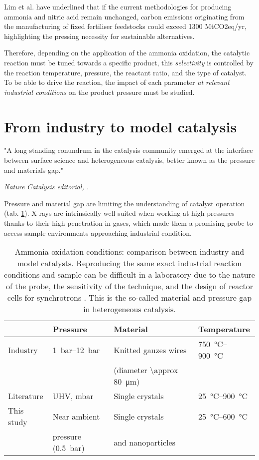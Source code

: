 Lim et al. \parencite*{Lim2021a} have underlined that if the current methodologies for producing ammonia and nitric acid remain unchanged, carbon emissions originating from the manufacturing of fixed fertiliser feedstocks could exceed 1300 MtCO2eq/yr, highlighting the pressing necessity for sustainable alternatives.

Therefore, depending on the application of the ammonia oxidation, the catalytic reaction must be tuned towards a specific product, this \textit{selectivity} is controlled by the reaction temperature, pressure, the reactant ratio, and the type of catalyst.
To be able to drive the reaction, the impact of each parameter \textit{at relevant industrial conditions} on the product pressure must be studied.

\section{From industry to model catalysis}\label{sec:LiteratureAmmonia}

\epigraph{"A long standing conundrum in the catalysis community emerged at the interface between surface science and heterogeneous catalysis, better known as the pressure and materials gap."}{\textit{Nature Catalysis editorial, \cite*{NatureEditorial2018}.}}

Pressure and material gap are limiting the understanding of catalyst operation (tab. \ref{tab:Gap}).
X-rays are intrinsically well suited when working at high pressures thanks to their high penetration in gases, which made them a promising probe to access sample environments approaching industrial condition.

\begin{table}[!htb]
    \centering
    \begin{tabular}{l|l|l|l}
    \toprule
                & Pressure    & Material                         &     Temperature \\
    \midrule
    Industry   & \qtyrange{1}{12}{\bar} & Knitted gauzes wires   & \qtyrange{750}{900}{\degreeCelsius} \\
               &              & (diameter \qty{\approx 80}{\um}) & \\
    \midrule
    Literature & UHV, mbar    & Single crystals                  & \qtyrange{25}{900}{\degreeCelsius} \\
    \midrule
    This study & Near ambient & Single crystals                  & \qtyrange{25}{600}{\degreeCelsius} \\
               & pressure (\qty{0.5}{\bar})  & and nanoparticles & \\
    \bottomrule
    \end{tabular}
    \caption{
        Ammonia oxidation conditions: comparison between industry and model catalysts.
        Reproducing the same exact industrial reaction conditions and sample can be difficult in a laboratory due to the nature of the probe, the sensitivity of the technique, and the design of reactor cells for synchrotrons \parencite{Hatscher2008}.
        This is the so-called material and pressure gap in heterogeneous catalysis.
    }
    \label{tab:Gap}
\end{table}

